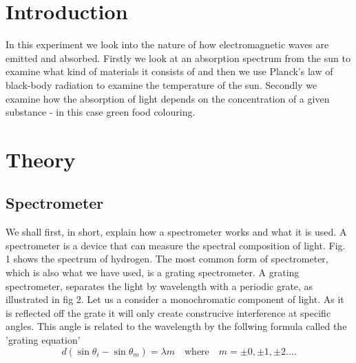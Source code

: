 \documentclass[working, oneside]{inputs/tuftebook}
\begin{document}
% 
\section*{Introduction}
In this experiment we look into the nature of how  electromagnetic waves are emitted and absorbed. Firstly we look at an absorption spectrum from the sun to examine what kind of materials it consists of and then we use Planck's law of black-body radiation to examine the temperature of the sun. Secondly we examine how the absorption of light depends on the concentration of a given substance - in this case green food colouring.
\section*{Theory}
\subsection*{Spectrometer}
We shall first, in short, explain how a spectrometer works and what it is used. A spectrometer is a device that can measure the spectral composition of light. Fig. 1 shows the spectrum of hydrogen. The most common form of spectrometer, which is also what we have used, is a grating spectrometer. A grating spectrometer, separates the light by wavelength with a periodic grate, as illustrated in fig 2. Let us a consider a monochromatic component of light. As it is reflected off the grate it will only create construcive interference at specific angles. This angle is related to the wavelength by the follwing formula called the 'grating equation'
\[
d\left( \sin \theta_i - \sin \theta_m \right) = \lambda m \quad \text{where}\quad  m = \pm 0, \pm 1, \pm 2 \ldots
.\] 
\end{document}
